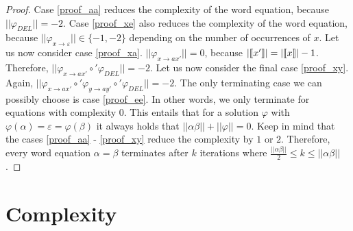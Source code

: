 \begin{proof}
Case \ref{proof_aa} reduces the complexity of the word equation, because $||\varphi_{DEL}|| = -2$. Case \ref{proof_xe} also reduces the complexity of the word equation, because $||\varphi_{x \rightarrow \varepsilon}|| \in \{-1, -2\}$ depending on the number of occurrences of $x$. Let us now consider case \ref{proof_xa}. $||\varphi_{x \rightarrow ax'}|| = 0$, because $|\llbracket x' \rrbracket| = |\llbracket x \rrbracket| - 1$. Therefore, $||\varphi_{x \rightarrow ax'} \circ' \varphi_{DEL}|| = -2$.
Let us now consider the final case \ref{proof_xy}.
Again, $||\varphi_{x \rightarrow ax'} \circ' \varphi_{y \rightarrow ay'} \circ' \varphi_{DEL}|| = -2$. The only terminating case we can possibly choose is case \ref{proof_ee}. In other words, we only terminate for equations with complexity $0$. This entails that for a solution $\varphi$ with $\varphi(\alpha) = \varepsilon = \varphi(\beta)$ it always holds that $||\alpha\beta|| + ||\varphi|| = 0$.
Keep in mind that the cases \ref{proof_aa} - \ref{proof_xy} reduce the complexity by $1$ or $2$. Therefore, every word equation $\alpha = \beta$ terminates after $k$ iterations where $\frac{||\alpha\beta||}{2} \leq k \leq ||\alpha\beta||$.

\end{proof}

\newpage
\section{Complexity}

